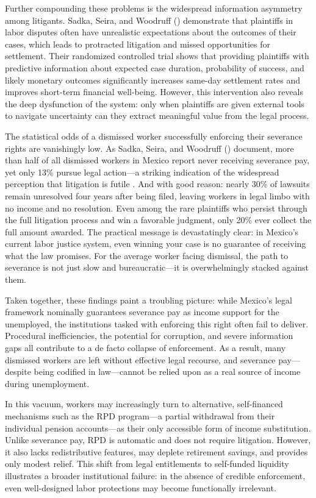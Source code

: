 \documentclass[
  4pt,
]{report}
\begin{document}
Further compounding these problems is the widespread information
asymmetry among litigants. Sadka, Seira, and Woodruff
() demonstrate that plaintiffs in labor
disputes often have unrealistic expectations about the outcomes of their
cases, which leads to protracted litigation and missed opportunities for
settlement. Their randomized controlled trial shows that providing
plaintiffs with predictive information about expected case duration,
probability of success, and likely monetary outcomes significantly
increases same-day settlement rates and improves short-term financial
well-being. However, this intervention also reveals the deep dysfunction
of the system: only when plaintiffs are given external tools to navigate
uncertainty can they extract meaningful value from the legal process.

The statistical odds of a dismissed worker successfully enforcing their
severance rights are vanishingly low. As Sadka, Seira, and Woodruff
() document, more than half of all
dismissed workers in Mexico report never receiving severance pay, yet
only 13\% pursue legal action---a striking indication of the widespread
perception that litigation is futile . And with good reason: nearly 30\%
of lawsuits remain unresolved four years after being filed, leaving
workers in legal limbo with no income and no resolution. Even among the
rare plaintiffs who persist through the full litigation process and win
a favorable judgment, only 20\% ever collect the full amount awarded.
The practical message is devastatingly clear: in Mexico's current labor
justice system, even winning your case is no guarantee of receiving what
the law promises. For the average worker facing dismissal, the path to
severance is not just slow and bureaucratic---it is overwhelmingly
stacked against them.

Taken together, these findings paint a troubling picture: while Mexico's
legal framework nominally guarantees severance pay as income support for
the unemployed, the institutions tasked with enforcing this right often
fail to deliver. Procedural inefficiencies, the potential for
corruption, and severe information gaps all contribute to a de facto
collapse of enforcement. As a result, many dismissed workers are left
without effective legal recourse, and severance pay---despite being
codified in law---cannot be relied upon as a real source of income
during unemployment.

In this vacuum, workers may increasingly turn to alternative,
self-financed mechanisms such as the RPD program---a partial withdrawal
from their individual pension accounts---as their only accessible form
of income substitution. Unlike severance pay, RPD is automatic and does
not require litigation. However, it also lacks redistributive features,
may deplete retirement savings, and provides only modest relief. This
shift from legal entitlements to self-funded liquidity illustrates a
broader institutional failure: in the absence of credible enforcement,
even well-designed labor protections may become functionally irrelevant.
\end{document}
